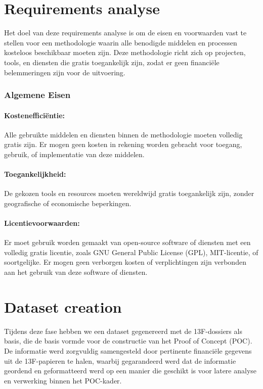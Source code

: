 \section{Requirements analyse}
Het doel van deze requirements analyse is om de eisen en voorwaarden vast te stellen voor een methodologie waarin alle benodigde middelen en processen kosteloos beschikbaar moeten zijn. Deze methodologie richt zich op projecten, tools, en diensten die gratis toegankelijk zijn, zodat er geen financiële belemmeringen zijn voor de uitvoering.

\subsubsection{Algemene Eisen}
\paragraph{Kostenefficiëntie:} Alle gebruikte middelen en diensten binnen de methodologie moeten volledig gratis zijn. Er mogen geen kosten in rekening worden gebracht voor toegang, gebruik, of implementatie van deze middelen.
\paragraph{Toegankelijkheid:} De gekozen tools en resources moeten wereldwijd gratis toegankelijk zijn, zonder geografische of economische beperkingen.
\paragraph{Licentievoorwaarden:} Er moet gebruik worden gemaakt van open-source software of diensten met een volledig gratis licentie, zoals GNU General Public License (GPL), MIT-licentie, of soortgelijke. Er mogen geen verborgen kosten of verplichtingen zijn verbonden aan het gebruik van deze software of diensten.

\section{Dataset creation}
Tijdens deze fase hebben we een dataset gegenereerd met de 13F-dossiers als basis, die de basis vormde voor de constructie van het Proof of Concept (POC). De informatie werd zorgvuldig samengesteld door pertinente financiële gegevens uit de 13F-papieren te halen, waarbij gegarandeerd werd dat de informatie geordend en geformatteerd werd op een manier die geschikt is voor latere analyse en verwerking binnen het POC-kader.

